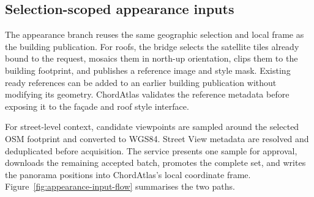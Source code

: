 \subsection{Selection-scoped appearance inputs}

The appearance branch reuses the same geographic selection and local frame as
the building publication.  For roofs, the bridge selects the satellite tiles
already bound to the request, mosaics them in north-up orientation, clips them
to the building footprint, and publishes a reference image and style
mask.  Existing ready references can be added to an earlier building
publication without modifying its geometry.  ChordAtlas validates the
reference metadata before exposing it to the fa\c{c}ade and roof style
interface.

For street-level context, candidate viewpoints are sampled around the selected
OSM footprint and converted to WGS84.  Street View metadata are resolved and
deduplicated before acquisition.  The service presents one sample for approval,
downloads the remaining accepted batch, promotes the complete set, and writes
the panorama positions into ChordAtlas's local coordinate frame.  Figure~\ref{fig:appearance-input-flow}
summarises the two paths.

